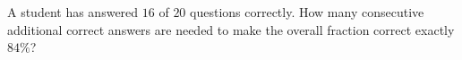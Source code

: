 A student has answered $16$ of $20$ questions correctly. How many consecutive additional correct answers are needed to make the overall fraction correct exactly $84\%$?
